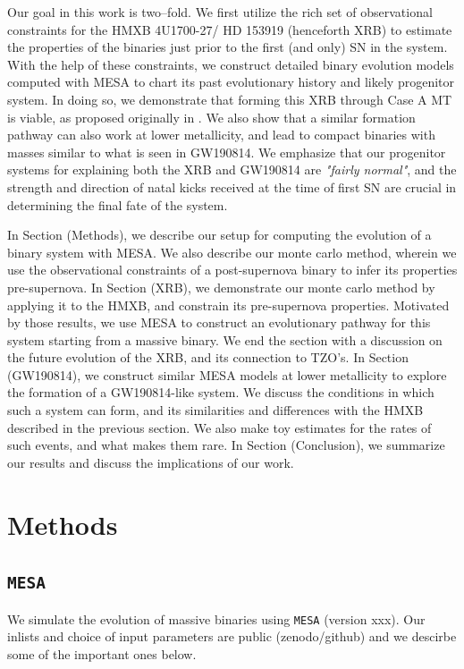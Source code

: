\documentclass[linenumbers,trackchanges,twocolumn]{aastex701}
\begin{document}
Our goal in this work is two--fold. We first utilize the rich set of observational constraints for the HMXB 4U1700-27/ HD 153919 (henceforth XRB) to estimate the properties of the binaries just prior to the first (and only) SN in the system. With the help of these constraints, we construct detailed binary evolution models computed with MESA to chart its past evolutionary history and likely progenitor system. In doing so, we demonstrate that forming this XRB through Case A MT is viable, as proposed originally in \cite{2021A&A...655A..31V}. We also show that a similar formation pathway can also work at lower metallicity, and lead to compact binaries with masses similar to what is seen in GW190814. We emphasize that our progenitor systems for explaining both the XRB and GW190814 are \textit{"fairly normal"}, and the strength and direction of natal kicks received at the time of first SN are crucial in determining the final fate of the system.

In Section (Methods), we describe our setup for computing the evolution of a binary system with MESA. We also describe our monte carlo method, wherein we use the observational constraints of a post-supernova binary to infer its properties pre-supernova. In Section (XRB), we demonstrate our monte carlo method by applying it to the HMXB, and constrain its pre-supernova properties. Motivated by those results, we use MESA to construct an evolutionary pathway for this system starting from a massive binary. We end the section with a discussion on the future evolution of the XRB, and its connection to TZO's. In Section (GW190814), we construct similar MESA models at lower metallicity to explore the formation of a GW190814-like system. We discuss the conditions in which such a system can form, and its similarities and differences with the HMXB described in the previous section. We also make toy estimates for the rates of such events, and what makes them rare. In Section (Conclusion), we summarize our results and discuss the implications of our work.

\section{Methods} \label{sec:methods}

\subsection{\texttt{MESA}}

We simulate the evolution of massive binaries using \texttt{MESA} (version xxx). Our inlists and choice of input parameters are public (zenodo/github) and we descirbe some of the important ones below.
\end{document}
